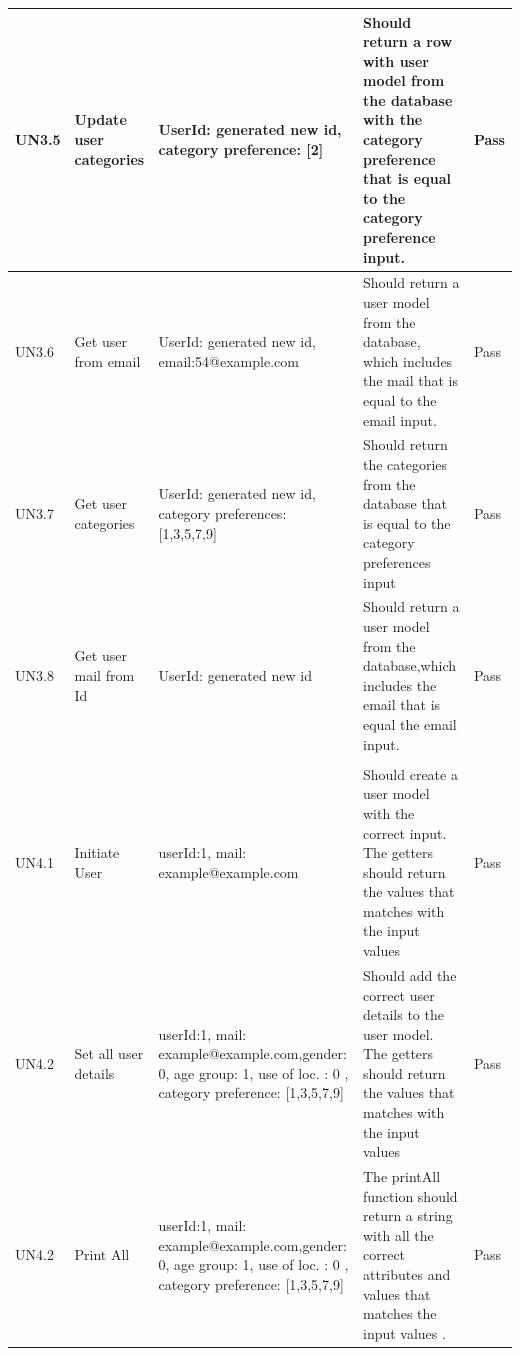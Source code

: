 \begin{appendices}
\begin{center}
\begin{longtable}{ | p{1cm} | p{5.5cm} | p{4cm} | p{4.5cm} | p{2cm}|}
		UN3.5 & Update user categories & UserId: generated new id, \newline category preference: [2] & Should return a row with user model from the database with the category preference that is equal to the category preference input.  & Pass\\ \hline
		
		UN3.6 & Get user from email & UserId: generated new id, \newline email:54@example.com & Should return a user model from the database, which includes the mail that is equal to the email input.   & Pass\\ \hline							
		
		UN3.7 & Get user categories & UserId: generated new id, \newline category preferences: [1,3,5,7,9] & Should return the categories from the database that is equal to the category preferences input  & Pass\\ \hline
		
		UN3.8 & Get user mail from Id  & UserId: generated new id  &  Should return a  user model from the database,which includes the email that is equal the email input. & Pass\\ \hline
		\pagebreak
		\hline
		\multicolumn{5}{| >{\columncolor[gray]{0.8}} c |}{Unit 4: User Model}	\\\hline
		
		UN4.1 & Initiate User   & userId:1, \newline mail: example@example.com & Should create a user model with the correct input. The getters should return the values that matches with the input values& Pass\\ \hline
		
		UN4.2 & Set all user details &userId:1, \newline mail: example@example.com,gender: 0, age group: 1, use of loc. : 0 , category preference: [1,3,5,7,9] & Should add the correct user details to the user model. The getters should return the values that matches with the input values  & Pass\\ \hline
		
		UN4.2 & Print All  &  userId:1, \newline mail: example@example.com,gender: 0, age group: 1, use of loc. : 0 , category preference: [1,3,5,7,9] & The printAll function should return a string with all the correct attributes and values that matches the input values .   & Pass\\ \hline
		

\end{longtable}
\end{center}
\end{appendices}
